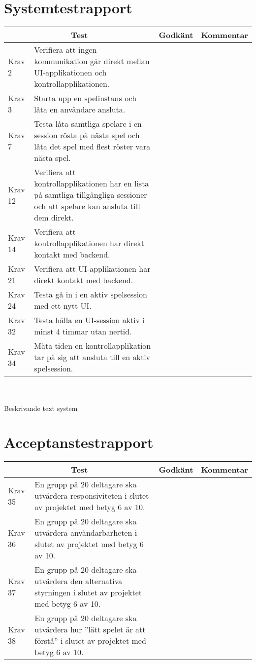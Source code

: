 \documentclass[10pt]{article}
\begin{document}
\section{Systemtestrapport}
	\begin{tabular}{| p{1.5cm} | p{8cm} | p{1.2cm}| p{8cm}|}
	
  \hline
    \multicolumn{2}{|c|}{Test}&{Godkänt}&{Kommentar}\\
    \hline
		Krav 2&Verifiera att ingen kommunikation går direkt mellan UI-applikationen och kontrollapplikationen.&&\\
		\hline
		Krav 3&Starta upp en spelinstans och låta en användare ansluta.&& \\
		\hline
		Krav 7& Testa låta samtliga spelare i en session rösta på nästa spel och låta det spel med flest röster vara nästa spel.&&\\
		\hline
		Krav 12& Verifiera att kontrollapplikationen har en lista på samtliga tillgängliga sessioner och att spelare kan ansluta till dem direkt.&& \\
		\hline
		Krav 14& Verifiera att kontrollapplikationen har direkt kontakt med backend.&& \\
		\hline
		Krav 21& Verifiera att UI-applikationen har direkt kontakt med backend.&& \\
		\hline
		Krav 24& Testa gå in i en aktiv spelsession med ett nytt UI.&& \\
		\hline
		Krav 32& Testa hålla en UI-session aktiv i minst 4 timmar utan nertid.&& \\
		\hline
		Krav 34& Mäta tiden en kontrollapplikation tar på sig att ansluta till en aktiv spelsession.&& \\
		\hline

   
  \end{tabular}
  \\
  \\
  Beskrivande text system
  \\
  
\section{Acceptanstestrapport}
	\begin{tabular}{| p{1.5cm} | p{8cm} | p{1.2cm}| p{8cm}|}
	
  \hline
    \multicolumn{2}{|c|}{Test}&{Godkänt}&{Kommentar}\\
    \hline


		Krav 35& En grupp på 20 deltagare ska utvärdera responsiviteten i slutet av projektet med betyg 6 av 10.&& \\
		\hline
		Krav 36& En grupp på 20 deltagare ska utvärdera användarbarheten i slutet av projektet med betyg 6 av 10.&& \\
		\hline
		Krav 37& En grupp på 20 deltagare ska utvärdera den alternativa styrningen i slutet av projektet med betyg 6 av 10.&& \\
		\hline
		Krav 38& En grupp på 20 deltagare ska utvärdera hur ''lätt spelet är att förstå'' i slutet av projektet med betyg 6 av 10.&& \\
		\hline

   
  \end{tabular}
  

\printbibliography
	
\end{document}
